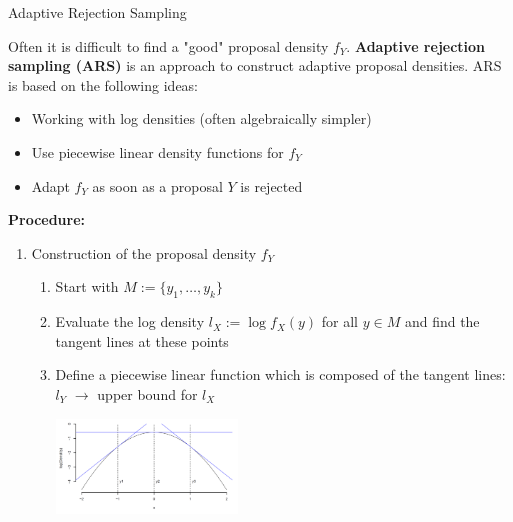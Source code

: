 \documentclass[11pt,compress,t,notes=noshow, xcolor=table]{beamer}
\begin{document}
\begin{vbframe}{Adaptive Rejection Sampling}

Often it is difficult to find a "good" proposal density $f_Y$. \textbf{Adaptive rejection sampling (ARS)} is an approach to construct adaptive proposal densities. ARS is based on the following ideas:

\begin{itemize}
\item Working with log densities (often algebraically simpler)
\item Use piecewise linear density functions for $f_Y$
\item Adapt $f_Y$ as soon as a proposal $Y$ is rejected
\end{itemize}

\framebreak

\textbf{Procedure:}
\begin{enumerate}
\item Construction of the proposal density $f_Y$
\begin{enumerate}
\item Start with $M := \{y_1,\ldots, y_k\}$
\item Evaluate the log density $l_X := \log f_X(y)$ for all $y \in M$ and find the tangent lines at these points
\item Define a piecewise linear function which is composed of the tangent lines: $l_Y$ $\to$ upper bound for $l_X$


\begin{center}
\includegraphics[width =0.4\textwidth]{figure_man/adaptive-rejection.png}
\end{center}








\end{enumerate}
\end{enumerate}
\end{vbframe}
\end{document}
